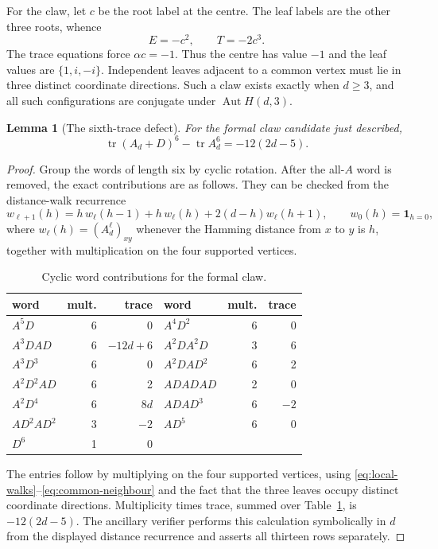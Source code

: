 \documentclass[11pt,reqno]{amsart}
\newtheorem{lemma}[theorem]{Lemma}
\theoremstyle{definition}
\theoremstyle{remark}
\DeclareMathOperator{\Aut}{Aut}
\DeclareMathOperator{\tr}{tr}
\begin{document}
For the claw, let $c$ be the root label at the centre.  The leaf labels are
the other three roots, whence
\[
 E=-c^2,\qquad T=-2c^3.
\]
The trace equations force $\alpha c=-1$.  Thus the centre has value $-1$
and the leaf values are $\{1,i,-i\}$.  Independent leaves adjacent to a
common vertex must lie in three distinct coordinate directions.  Such a claw
exists exactly when $d\geq3$, and all such configurations are conjugate
under $\Aut H(d,3)$.

\begin{lemma}[The sixth-trace defect]\label{lem:trace6}
For the formal claw candidate just described,
\begin{equation}\label{eq:sixth-defect}
 \tr(A_d+D)^6-\tr A_d^6=-12(2d-5).
\end{equation}
\end{lemma}

\begin{proof}
Group the words of length six by cyclic rotation.  After the all-$A$ word is
removed, the exact contributions are as follows.  They can be checked from
the distance-walk recurrence
\[
 w_{\ell+1}(h)
 =h\,w_\ell(h-1)+h\,w_\ell(h)+2(d-h)w_\ell(h+1),
 \qquad w_0(h)=\mathbf 1_{h=0},
\]
where $w_\ell(h)=(A_d^\ell)_{xy}$ whenever the Hamming distance from $x$ to
$y$ is $h$, together with multiplication on the four supported vertices.
\begin{table}[htbp]
\centering
\caption{Cyclic word contributions for the formal claw.}
\label{tab:trace-six}
\begin{tabular}{lrr@{\qquad}lrr}
\toprule
word & mult. & trace & word & mult. & trace\\
\midrule
$A^5D$     &6&0          &$A^4D^2$   &6&0\\
$A^3DAD$   &6&$-12d+6$   &$A^2DA^2D$ &3&6\\
$A^3D^3$   &6&0          &$A^2DAD^2$ &6&2\\
$A^2D^2AD$ &6&2          &$ADADAD$    &2&0\\
$A^2D^4$   &6&$8d$       &$ADAD^3$    &6&$-2$\\
$AD^2AD^2$ &3&$-2$       &$AD^5$      &6&0\\
$D^6$      &1&0          &&&\\
\bottomrule
\end{tabular}
\end{table}
The entries follow by multiplying on the four supported vertices, using
\eqref{eq:local-walks}--\eqref{eq:common-neighbour} and the fact that the
three leaves occupy distinct coordinate directions.  Multiplicity times
trace, summed over Table~\ref{tab:trace-six}, is $-12(2d-5)$.  The ancillary
verifier performs this calculation symbolically in $d$ from the displayed
distance recurrence and asserts all thirteen rows separately.
\end{proof}
\end{document}
